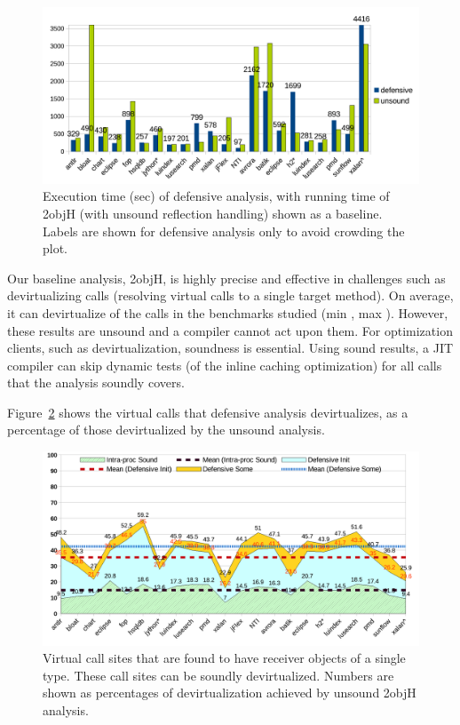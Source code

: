 \begin{figure}[tbh]
\centering
\includegraphics[width=\linewidth]{assets/defensive/time.pdf}
\caption[Execution time of defensive analysis vs. unsound baseline]{Execution time (sec) of defensive analysis, with running time of 2objH (with unsound reflection handling) shown as a baseline. Labels are shown for defensive analysis only to avoid crowding the plot.}
\label{fig:sound:time}
\end{figure}


Our baseline analysis, 2objH, is highly precise and effective in challenges such as devirtualizing calls (resolving virtual calls to a single target method). On average, it can devirtualize  of the calls in the benchmarks studied (min , max ). However, these results are unsound and a compiler cannot act upon them. For optimization clients, such as devirtualization, soundness is essential. Using sound results, a JIT compiler can skip dynamic tests (of the inline caching optimization) for all calls that the analysis soundly covers.

Figure~\ref{fig:sound:devirt1} shows the virtual calls that defensive analysis devirtualizes, as a percentage of those devirtualized by the unsound analysis.

\begin{figure}[tbh]
\centering
\includegraphics[width=\linewidth]{assets/defensive/devirt1.pdf}
\caption[Virtual call sites found with a single typed receiver objects]{Virtual call sites that are found to have receiver objects of a single type. These call sites can be soundly devirtualized. Numbers are shown as percentages of devirtualization achieved by unsound 2objH analysis.}
\label{fig:sound:devirt1}
\end{figure}

